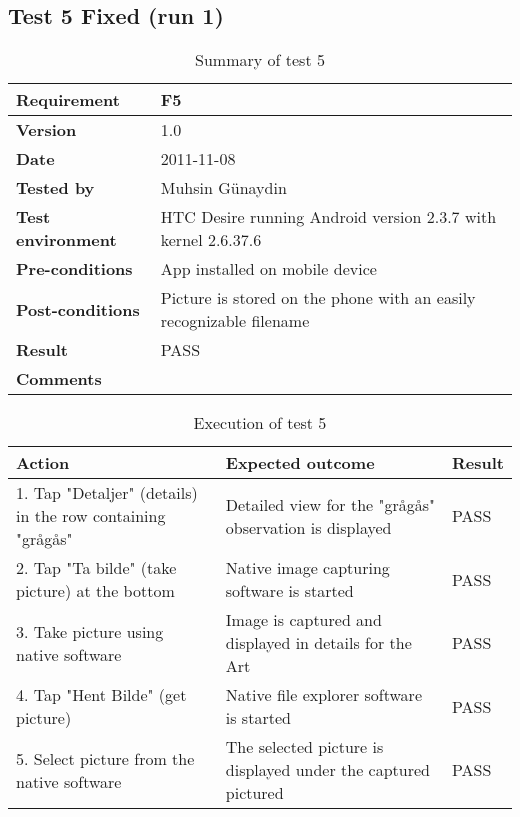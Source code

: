 
\subsection*{Test 5 Fixed (run 1)}

	\begin{table}[htb]
		\centering
		\begin{tabular}{|p{3.5cm}|p{7.0cm}|} \hline
			\textbf{Requirement} & F5 \\ \hline
			\textbf{Version} & 1.0 \\ \hline
			\textbf{Date} & 2011-11-08 \\ \hline
			\textbf{Tested by} & Muhsin Günaydin \\ \hline
			\textbf{Test environment} & HTC Desire running Android version 2.3.7 with kernel 2.6.37.6 \\ \hline
			\textbf{Pre-conditions} & App installed on mobile device \\ \hline
			\textbf{Post-conditions} & Picture is stored on the phone with an easily recognizable filename \\ \hline
			\textbf{Result} & PASS \\ \hline
			\textbf{Comments} & \\ \hline
		\end{tabular}
		\caption{Summary of test 5}
	\end{table}

	\begin{table}[htb]
		\centering
		\begin{tabular}{|p{5.0cm}|p{5.0cm}|p{1cm}|}
			\hline \textbf{Action} & \textbf{Expected outcome} & \textbf{Result} \\ \hline
			1. Tap "Detaljer" (details) in the row containing "grågås"  &
			Detailed view for the "grågås" observation is displayed & 
			PASS \\ \hline

			2. Tap "Ta bilde" (take picture) at the bottom &
			Native image capturing software is started &
			PASS\\ \hline

			3. Take picture using native software &
			Image is captured and displayed in details for the Art &
			PASS\\ \hline
			
			4. Tap "Hent Bilde" (get picture) &
			Native file explorer software is started &
			PASS\\ \hline

			5. Select picture from the native software &
			The selected picture is displayed under the captured pictured &
			PASS\\ \hline
		
		\end{tabular}
		\caption{Execution of test 5}
	\end{table}


\newpage
